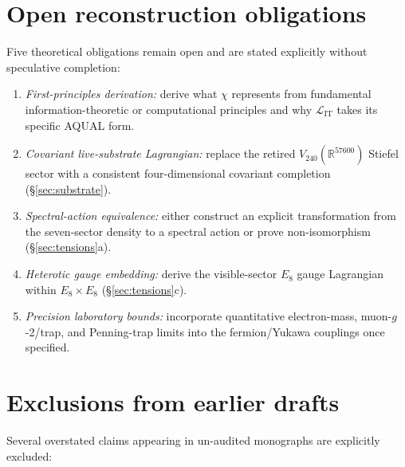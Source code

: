 \documentclass{alienfolio}
\begin{document}
\section{Open reconstruction obligations}
\label{sec:pending}

Five theoretical obligations remain open and are stated explicitly
without speculative completion:

\begin{enumerate}
\item \emph{First-principles derivation:} derive what $\chi$ represents
from fundamental information-theoretic or computational principles and
why $\mathcal{L}_{\mathrm{IT}}$ takes its specific AQUAL form.
\item \emph{Covariant live-substrate Lagrangian:} replace the retired
$V_{240}(\mathbb{R}^{57600})$ Stiefel sector with a consistent
four-dimensional covariant completion (\S\ref{sec:substrate}).
\item \emph{Spectral-action equivalence:} either construct an explicit
transformation from the seven-sector density to a spectral action or
prove non-isomorphism (\S\ref{sec:tensions}a).
\item \emph{Heterotic gauge embedding:} derive the visible-sector $E_8$
gauge Lagrangian within $E_8 \times E_8$ (\S\ref{sec:tensions}c).
\item \emph{Precision laboratory bounds:} incorporate quantitative
electron-mass, muon-$g$-2/trap, and Penning-trap limits into the
fermion/Yukawa couplings once specified.
\end{enumerate}

\section{Exclusions from earlier drafts}

Several overstated claims appearing in un-audited monographs are
explicitly excluded:
\end{document}
